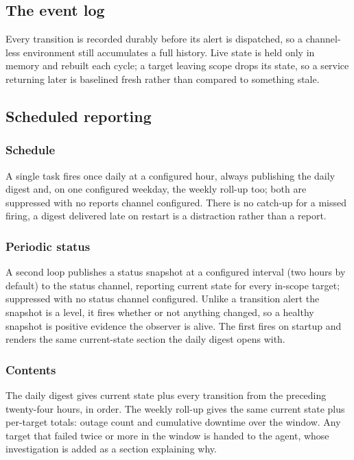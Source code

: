 \documentclass[11pt,a4paper]{article}
\begin{document}
\subsection{The event log}

Every transition is recorded durably before its alert is dispatched, so a
channel-less environment still accumulates a full history. Live state is held only
in memory and rebuilt each cycle; a target leaving scope drops its state, so a
service returning later is baselined fresh rather than compared to something stale.

\subsection{Scheduled reporting}

\subsubsection{Schedule}

A single task fires once daily at a configured hour, always publishing the daily
digest and, on one configured weekday, the weekly roll-up too; both are suppressed
with no reports channel configured. There is no catch-up for a missed firing, a
digest delivered late on restart is a distraction rather than a report.

\subsubsection{Periodic status}

A second loop publishes a status snapshot at a configured interval (two hours by
default) to the status channel, reporting current state for every in-scope target;
suppressed with no status channel configured. Unlike a transition alert the snapshot
is a level, it fires whether or not anything changed, so a healthy snapshot is
positive evidence the observer is alive. The first fires on startup and renders the
same current-state section the daily digest opens with.

\subsubsection{Contents}

The daily digest gives current state plus every transition from the preceding
twenty-four hours, in order. The weekly roll-up gives the same current state plus
per-target totals: outage count and cumulative downtime over the window. Any target
that failed twice or more in the window is handed to the agent, whose investigation
is added as a section explaining why.
\end{document}

